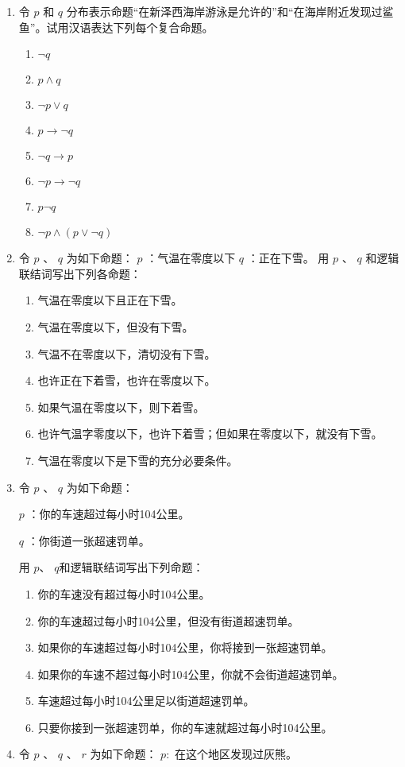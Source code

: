\begin{enumerate}
	\item
		令
		$p$
		和
		$q$
		分布表示命题“在新泽西海岸游泳是允许的”和“在海岸附近发现过鲨鱼”。试用汉语表达下列每个复合命题。
		\begin{enumerate}
			\item	$\neg q$
			\item	$p \land q$
			\item	$\neg p \lor q$
			\item	$p \to \neg q$
			\item	$\neg q \to p$
			\item	$\neg p \to \neg q$
			\item	$p \neg q$
			\item	$\neg p \land (p \lor \neg q)$
		\end{enumerate}
	\item
		令
		$p$
		、
		$q$
		为如下命题：
		$p$
		：气温在零度以下
		$q$
		：正在下雪。
		用
		$p$
		、
		$q$
		和逻辑联结词写出下列各命题：
		\begin{enumerate}
			\item	气温在零度以下且正在下雪。
			\item	气温在零度以下，但没有下雪。
			\item	气温不在零度以下，清切没有下雪。
			\item	也许正在下着雪，也许在零度以下。
			\item	如果气温在零度以下，则下着雪。
			\item	也许气温字零度以下，也许下着雪；但如果在零度以下，就没有下雪。
			\item	气温在零度以下是下雪的充分必要条件。
		\end{enumerate}
	\item
		令
		$p$
		、
		$q$
		为如下命题：

		$p$
		：你的车速超过每小时104公里。

		$q$
		：你街道一张超速罚单。

		用
		$p$、
		$q$和逻辑联结词写出下列命题：
		\begin{enumerate}
			\item	你的车速没有超过每小时104公里。
			\item	你的车速超过每小时104公里，但没有街道超速罚单。
			\item	如果你的车速超过每小时104公里，你将接到一张超速罚单。
			\item	如果你的车速不超过每小时104公里，你就不会街道超速罚单。
			\item	车速超过每小时104公里足以街道超速罚单。
			\item	只要你接到一张超速罚单，你的车速就超过每小时104公里。
		\end{enumerate}
	\item
		令
		$p$
		、
		$q$
		、
		$r$
		为如下命题：
		$p:$
		在这个地区发现过灰熊。


\end{enumerate}

